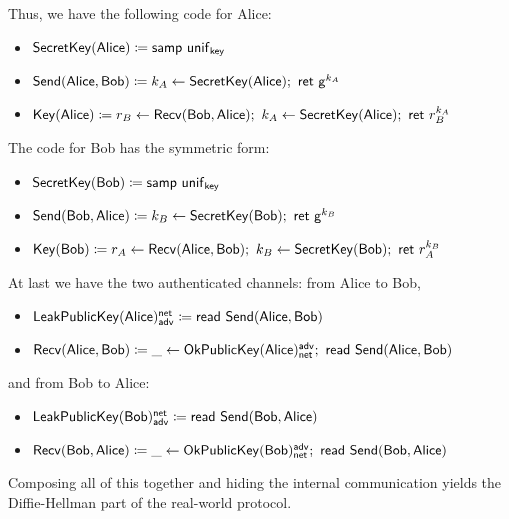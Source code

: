 Thus, we have the following code for Alice:
\begin{itemize}
\item $\mathsf{SecretKey}(\mathsf{Alice}) \coloneqq \mathsf{samp} \ \mathsf{unif}_{\mathsf{key}}$
\item $\mathsf{Send}(\mathsf{Alice},\mathsf{Bob}) \coloneqq k_A \leftarrow \mathsf{SecretKey}(\mathsf{Alice}); \ \mathsf{ret} \ \mathsf{g}^{k_A}$
\item $\Key(\Alice) \coloneqq r_B \leftarrow \Recv(\Bob,\Alice); \ k_A \leftarrow \SecretKey(\Alice); \ \ret{r_B^{k_A}}$
\end{itemize}
The code for Bob has the symmetric form:
\begin{itemize}
\item $\mathsf{SecretKey}(\mathsf{Bob}) \coloneqq \mathsf{samp} \ \mathsf{unif}_{\mathsf{key}}$
\item $\mathsf{Send}(\mathsf{Bob},\mathsf{Alice}) \coloneqq k_B \leftarrow \mathsf{SecretKey}(\mathsf{Bob}); \ \mathsf{ret} \ \mathsf{g}^{k_B}$
\item $\Key(\Bob) \coloneqq r_A \leftarrow \Recv(\Alice,\Bob); \ k_B \leftarrow \SecretKey(\Bob); \ \ret{r_A^{k_B}}$
\end{itemize}
At last we have the two authenticated channels: from Alice to Bob,
\begin{itemize}
\item $\mathsf{LeakPublicKey}(\mathsf{Alice})^{\mathsf{net}}_{\mathsf{adv}} \coloneqq \mathsf{read} \ \mathsf{Send}(\mathsf{Alice},\mathsf{Bob})$
\item $\Recv(\Alice,\Bob) \coloneqq \_ \leftarrow \OkPublicKey(\Alice)^\adv_\net; \ \read{\Send(\Alice,\Bob)}$
\end{itemize}
and from Bob to Alice:
\begin{itemize}
\item $\mathsf{LeakPublicKey}(\mathsf{Bob})^{\mathsf{net}}_{\mathsf{adv}} \coloneqq \mathsf{read} \ \mathsf{Send}(\mathsf{Bob},\mathsf{Alice})$
\item $\Recv(\Bob,\Alice) \coloneqq \_ \leftarrow \OkPublicKey(\Bob)^\adv_\net; \ \read{\Send(\Bob,\Alice)}$
\end{itemize}
Composing all of this together and hiding the internal communication yields the Diffie-Hellman part of the real-world protocol.

